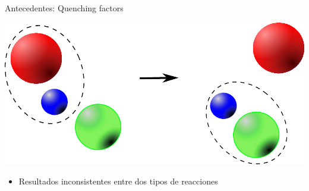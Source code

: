 \documentclass{beamer}
\begin{document}
\begin{frame}{Antecedentes: Quenching factors}
\begin{minipage}{0.45\textwidth}
\begin{center}
    \includegraphics[height=0.3\textheight,width=\textwidth, keepaspectratio]{transfer.pdf}
    \end{center}
    \end{minipage}
    \begin{itemize}
    \item Resultados inconsistentes entre dos tipos de reacciones
    \end{itemize}
    
\end{frame}
\end{document}

